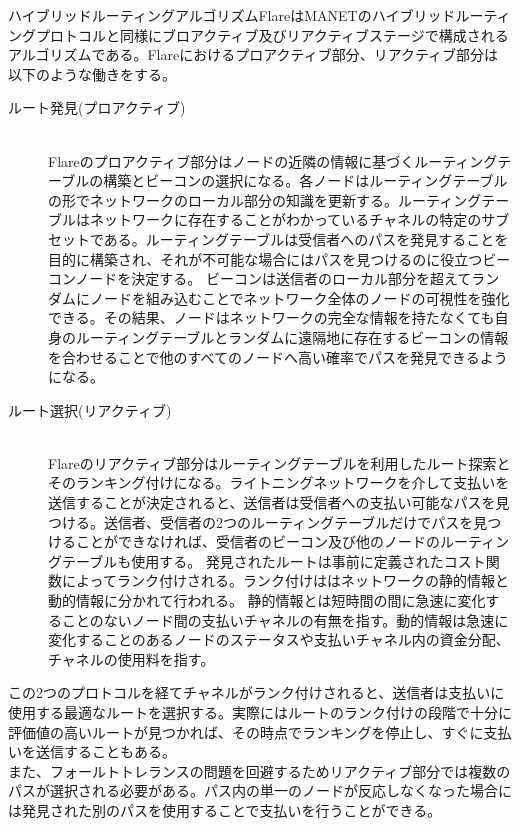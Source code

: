 \documentclass[12pt]{jarticle}
\begin{document}
ハイブリッドルーティングアルゴリズムFlareはMANETのハイブリッドルーティングプロトコルと同様にブロアクティブ及びリアクティブステージで構成されるアルゴリズムである。Flareにおけるプロアクティブ部分、リアクティブ部分\cite{flare}は以下のような働きをする。

\begin{description}
\item[ルート発見(プロアクティブ)] \leavevmode \\
Flareのプロアクティブ部分はノードの近隣の情報に基づくルーティングテーブルの構築とビーコンの選択になる。各ノードはルーティングテーブルの形でネットワークのローカル部分の知識を更新する。ルーティングテーブルはネットワークに存在することがわかっているチャネルの特定のサブセットである。ルーティングテーブルは受信者へのパスを発見することを目的に構築され、それが不可能な場合にはパスを見つけるのに役立つビーコンノードを決定する。
ビーコンは送信者のローカル部分を超えてランダムにノードを組み込むことでネットワーク全体のノードの可視性を強化できる。その結果、ノードはネットワークの完全な情報を持たなくても自身のルーティングテーブルとランダムに遠隔地に存在するビーコンの情報を合わせることで他のすべてのノードへ高い確率でパスを発見できるようになる。

\item[ルート選択(リアクティブ)] \leavevmode \\
Flareのリアクティブ部分はルーティングテーブルを利用したルート探索とそのランキング付けになる。ライトニングネットワークを介して支払いを送信することが決定されると、送信者は受信者への支払い可能なパスを見つける。送信者、受信者の2つのルーティングテーブルだけでパスを見つけることができなければ、受信者のビーコン及び他のノードのルーティングテーブルも使用する。
発見されたルートは事前に定義されたコスト関数によってランク付けされる。ランク付けははネットワークの静的情報と動的情報に分かれて行われる。
静的情報とは短時間の間に急速に変化することのないノード間の支払いチャネルの有無を指す。動的情報は急速に変化することのあるノードのステータスや支払いチャネル内の資金分配、チャネルの使用料を指す。
\end{description}

この2つのプロトコルを経てチャネルがランク付けされると、送信者は支払いに使用する最適なルートを選択する。実際にはルートのランク付けの段階で十分に評価値の高いルートが見つかれば、その時点でランキングを停止し、すぐに支払いを送信することもある。\\
また、フォールトトレランスの問題を回避するためリアクティブ部分では複数のパスが選択される必要がある。パス内の単一のノードが反応しなくなった場合には発見された別のパスを使用することで支払いを行うことができる。
\end{document}
